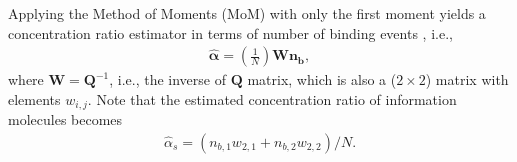 \documentclass[twocolumn]{IEEEtran}
\newcommand{\e}{\mathrm{e}}
\begin{document}
Applying the Method of Moments (MoM) with only the first moment yields a concentration ratio estimator in terms of number of binding events \cite{kuscu2019channel}, i.e., 
\begin{align} \label{Wmatrix}
\bm{\hat{\alpha}} = \left(\frac{1}{N}\right) \bm{W} \bm{n_b},  
\end{align}
where $\bm{W} = \bm{Q}^{-1}$, i.e., the inverse of $\bm{Q}$ matrix, which is also a ($2 \times 2$) matrix with elements $w_{i,j}$. 
Note that the estimated concentration ratio of information molecules becomes
\begin{align}
\hat{\alpha}_s =  \left( n_{b,1} w_{2,1} + n_{b,2} w_{2,2} \right)/N. \label{alpha_estimator}
\end{align}

\end{document}

